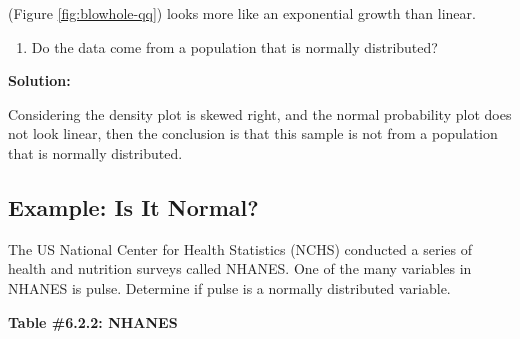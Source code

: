 \documentclass[]{book}
\providecommand{\tightlist}{%
  \setlength{\itemsep}{0pt}\setlength{\parskip}{0pt}}
\begin{document}
(Figure \ref{fig:blowhole-qq}) looks more like an exponential growth than linear.

\begin{enumerate}
\def\labelenumi{\alph{enumi}.}
\setcounter{enumi}{4}
\tightlist
\item
  Do the data come from a population that is normally distributed?
\end{enumerate}

\textbf{Solution:}

Considering the density plot is skewed right, and the normal probability plot does not look linear, then the conclusion is that this sample is not from a population that is normally distributed.

\hypertarget{example-is-it-normal-1}{%
\subsection{Example: Is It Normal?}\label{example-is-it-normal-1}}

The US National Center for Health Statistics (NCHS) conducted a series of health and nutrition surveys called NHANES. One of the many variables in NHANES is pulse. Determine if pulse is a normally distributed variable.

\textbf{Table \#6.2.2: NHANES}
\end{document}
